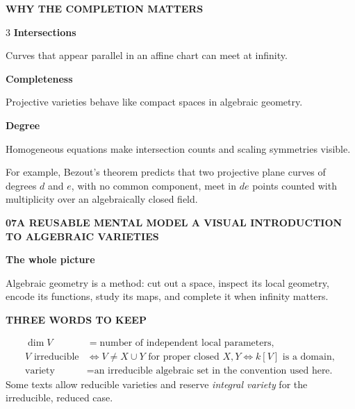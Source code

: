 \documentclass[9pt,a4paper]{extarticle}
\newcommand{\Pj}{\mathbb{P}}
\newcommand{\kk}{k}
\newcommand{\footertext}{ALGEBRAIC VARIETIES}
\newcommand{\pagehead}[3]{%
  {\fontsize{7.2}{8}\selectfont\bfseries\color{teal}#1\quad #2\hfill
   \normalfont\color{muted}A VISUAL INTRODUCTION TO ALGEBRAIC VARIETIES}\par
  \vspace{2.5pt}{\color{line}\hrule height 0.45pt}\vspace{8pt}
  {\fontsize{21}{23}\selectfont\bfseries\color{navy}#3}\par\vspace{5pt}}
\newcommand{\lead}[1]{{\fontsize{11.2}{15.2}\selectfont #1\par}\vspace{6pt}}
\newcommand{\eyebrow}[1]{{\fontsize{7.2}{8}\selectfont\bfseries\color{teal}\MakeUppercase{#1}}}
\begin{document}
\vspace{6pt}
\begin{tealbox}
\eyebrow{Why the completion matters}\par\vspace{3pt}
\begin{multicols}{3}
\textbf{Intersections}\par
Curves that appear parallel in an affine chart can meet at infinity.

\columnbreak
\textbf{Completeness}\par
Projective varieties behave like compact spaces in algebraic geometry.

\columnbreak
\textbf{Degree}\par
Homogeneous equations make intersection counts and scaling symmetries visible.
\end{multicols}
\end{tealbox}

\vspace{3pt}
{\small For example, Bezout's theorem predicts that two projective plane curves of degrees $d$ and $e$, with no common component, meet in $de$ points counted with multiplicity over an algebraically closed field.}
\newpage

\renewcommand{\footertext}{DIMENSION / IRREDUCIBILITY / YOUR NEXT PROBLEM}
\pagehead{07}{A REUSABLE MENTAL MODEL}{The whole picture}
\lead{Algebraic geometry is a method: cut out a space, inspect its local geometry, encode its functions, study its maps, and complete it when infinity matters.}

\begin{center}
\end{center}

\vspace{5pt}
\begin{quietbox}
\eyebrow{Three words to keep}\par\vspace{3pt}
\begin{align*}
\dim V&=\text{number of independent local parameters},\\
V\text{ irreducible}
&\Longleftrightarrow V\neq X\cup Y\text{ for proper closed }X,Y
\Longleftrightarrow \kk[V]\text{ is a domain},\\
\text{variety}
&=\text{an irreducible algebraic set in the convention used here.}
\end{align*}
Some texts allow reducible varieties and reserve \emph{integral variety} for the irreducible, reduced case.
\end{quietbox}
\end{document}
